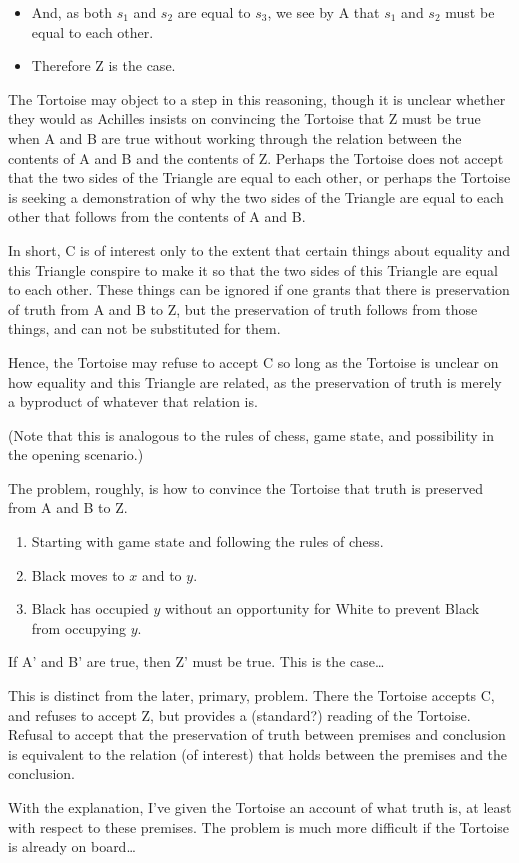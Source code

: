 \documentclass[10pt]{article}
\begin{document}
\begin{note}
\begin{itemize}
  \item And, as both \(s_{1}\) and \(s_{2}\) are equal to \(s_{3}\), we see by A that \(s_{1}\) and \(s_{2}\) must be equal to each other.
  \item Therefore Z is the case.
  \end{itemize}
  The Tortoise may object to a step in this reasoning, though it is unclear whether they would as Achilles insists on convincing the Tortoise that Z must be true when A and B are true without working through the relation between the contents of A and B and the contents of Z.
  Perhaps the Tortoise does not accept that the two sides of the Triangle are equal to each other, or perhaps the Tortoise is seeking a demonstration of why the two sides of the Triangle are equal to each other that follows from the contents of A and B.

  In short, C is of interest only to the extent that certain things about equality and this Triangle conspire to make it so that the two sides of this Triangle are equal to each other.
  These things can be ignored if one grants that there is preservation of truth from A and B to Z, but the preservation of truth follows from those things, and can not be substituted for them.

  Hence, the Tortoise may refuse to accept C so long as the Tortoise is unclear on how equality and this Triangle are related, as the preservation of truth is merely a byproduct of whatever that relation is.

  (Note that this is analogous to the rules of chess, game state, and possibility in the opening scenario.)
    {
    \color{red}
    The problem, roughly, is how to convince the Tortoise that truth is preserved from A and B to Z.
    \begin{enumerate}
    \item Starting with game state and following the rules of chess.
    \item Black moves to \(x\) and to \(y\).
    \item Black has occupied \(y\) without an opportunity for White to prevent Black from occupying \(y\).
    \end{enumerate}
    If A' and B' are true, then Z' must be true.
    This is the case\dots
  }

  This is distinct from the later, primary, problem.
  There the Tortoise accepts C, and refuses to accept Z, but provides a (standard?) reading of the Tortoise.
  Refusal to accept that the preservation of truth between premises and conclusion is equivalent to the relation (of interest) that holds between the premises and the conclusion.

  With the explanation, I've given the Tortoise an account of what truth is, at least with respect to these premises.
  The problem is much more difficult if the Tortoise is already on board\dots
\end{note}
\end{document}
